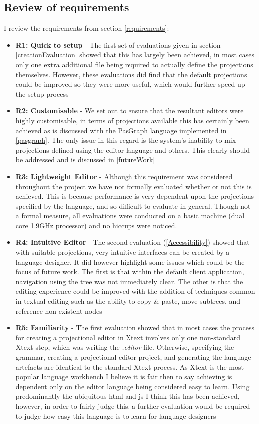 \documentclass{article}
\begin{document}
\subsection{Review of requirements}
I review the requirements from section \ref{requirements}:
\begin{itemize}
\item{\textbf{R1: Quick to setup} - The first set of evaluations given in section \ref{creationEvaluation} showed that this has largely been achieved, in most cases only one extra additional file being required to actually define the projections themselves. However, these evaluations did find that the default projections could be improved so they were more useful, which would further speed up the setup process}
\item{\textbf{R2: Customisable} - We set out to ensure that the resultant editors were highly customisable, in terms of projections available this has certainly been achieved as is discussed with the PasGraph language implemented in \ref{pasgraph}. The only issue in this regard is the system's inability to mix projections defined using the editor language and others. This clearly should be addressed and is discussed in \ref{futureWork}  }
\item{\textbf{R3: Lightweight Editor} - Although this requirement was considered throughout the project we have not formally evaluated whether or not this is achieved. This is because performance is very dependent upon the projections specified by the language, and so difficult to evaluate in general. Though not a formal measure, all evaluations were conducted on a basic machine (dual core 1.9GHz processor) and no hiccups were noticed. }
\item{\textbf{R4: Intuitive Editor} - The second evaluation (\ref{Accessibility}) showed that with suitable projections, very intuitive interfaces can be created by a language designer. It did however highlight some issues which could be the focus of future work. The first is that within the default client application, navigation using the tree was not immediately clear. The other is that the editing experience could be improved with the addition of techniques common in textual editing such as the ability to copy \& paste, move subtrees, and reference non-existent nodes}
\item{\textbf{R5: Familiarity} - The first evaluation showed that in most cases the process for creating a projectional editor in Xtext involves only one non-standard Xtext step, which was writing the \emph{.editor} file. Otherwise, specifying the grammar, creating a projectional editor project, and generating the language artefacts are identical to the standard Xtext process. As Xtext is the most popular language workbench I believe it is fair then to say achieving \RFamiliarity is dependent only on the editor language being considered easy to learn. Using predominantly the ubiquitous html and js I think this has been achieved, however, in order to fairly judge this, a further evaluation would be required to judge how easy this language is to learn for language designers}
\end{itemize}
\end{document}
